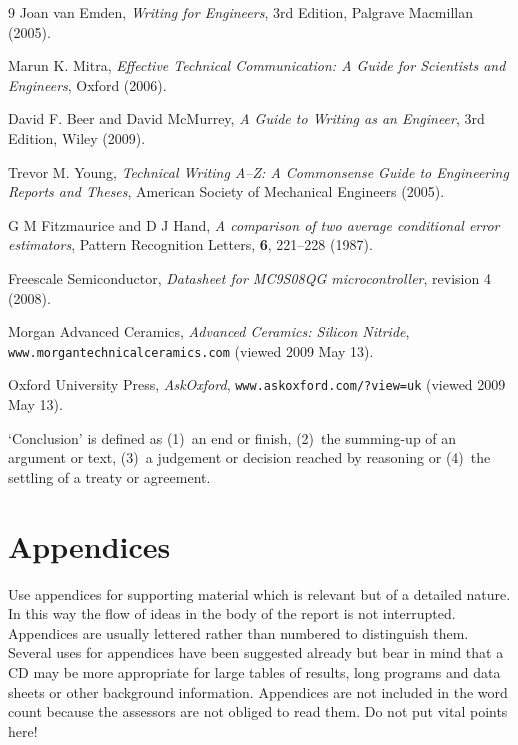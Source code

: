 \documentclass[a4paper,12pt]{article}
\begin{document}
\clearpage %
\begin{thebibliography}{9}
Joan van Emden,
\textit{Writing for Engineers},
3rd Edition,
Palgrave Macmillan 
(2005).

Marun K. Mitra,
\textit{Effective Technical Communication: A Guide for Scientists and Engineers},
Oxford
(2006).

David F. Beer and David McMurrey,
\textit{A Guide to Writing as an Engineer},
3rd Edition,
Wiley
(2009).

Trevor M. Young,
\textit{Technical Writing A--Z: A Commonsense Guide to Engineering Reports and Theses},
American Society of Mechanical Engineers
(2005).

G M Fitzmaurice and D J Hand, 
\textit{A comparison of two average conditional error estimators}, 
Pattern Recognition Letters, 
\textbf{6}, 
221--228 
(1987).

Freescale Semiconductor,
\textit{Datasheet for MC9S08QG microcontroller},
revision 4
(2008).

Morgan Advanced Ceramics, 
\textit{Advanced Ceramics: Silicon Nitride}, \texttt{www.morgantechnicalceramics.com} 
(viewed 2009 May 13).

Oxford University Press, 
\textit{AskOxford},
\texttt{www.askoxford.com/?view=uk}
(viewed 2009 May 13).

`Conclusion' is defined as (1)~an end or finish, (2)~the summing-up of an argument or text, (3)~a judgement or decision reached by reasoning or (4)~the settling of a treaty or agreement.
\end{thebibliography}

\clearpage %
\appendix

\section{Appendices}

Use appendices for supporting material which is relevant but of a detailed nature. In this way the flow of ideas in the body of the report is not interrupted. Appendices are usually lettered rather than numbered to distinguish them. Several uses for appendices have been suggested already but bear in mind that a CD may be more appropriate for large tables of results, long programs and data sheets or other background information. Appendices are not included in the word count because the assessors are not obliged to read them. Do not put vital points here!
\end{document}
